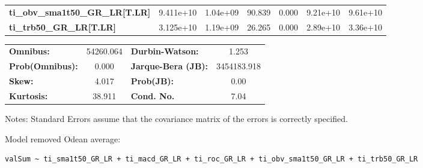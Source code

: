 \begin{center}
\begin{tabular}{lcccccc}
\textbf{ti\_obv\_sma1t50\_GR\_LR[T.LR]} &    9.411e+10  &     1.04e+09     &    90.839  &         0.000        &     9.21e+10    &     9.61e+10     \\
\textbf{ti\_trb50\_GR\_LR[T.LR]}        &    3.125e+10  &     1.19e+09     &    26.265  &         0.000        &     2.89e+10    &     3.36e+10     \\
\bottomrule
\end{tabular}
\begin{tabular}{lclc}
\textbf{Omnibus:}       & 54260.064 & \textbf{  Durbin-Watson:     } &      1.253   \\
\textbf{Prob(Omnibus):} &    0.000  & \textbf{  Jarque-Bera (JB):  } & 3454183.918  \\
\textbf{Skew:}          &    4.017  & \textbf{  Prob(JB):          } &       0.00   \\
\textbf{Kurtosis:}      &   38.911  & \textbf{  Cond. No.          } &       7.04   \\
\bottomrule
\end{tabular}
\end{center}

Notes: \newline
 [1] Standard Errors assume that the covariance matrix of the errors is correctly specified.

Model removed Odean average: \begin{verbatim}valSum ~ ti_sma1t50_GR_LR + ti_macd_GR_LR + ti_roc_GR_LR + ti_obv_sma1t50_GR_LR + ti_trb50_GR_LR\end{verbatim}

